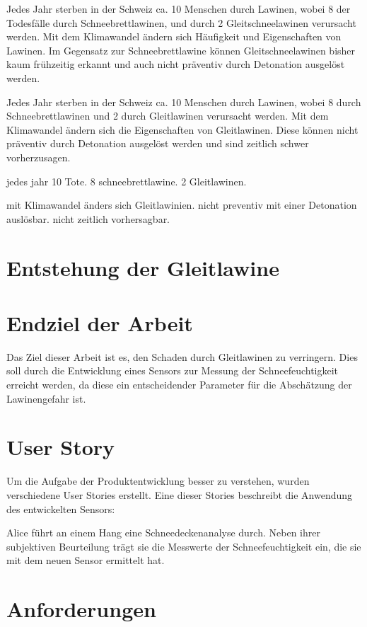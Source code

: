 Jedes Jahr sterben in der Schweiz ca. 10 Menschen durch Lawinen, wobei 8 der Todesfälle durch Schneebrettlawinen, und durch 2 Gleitschneelawinen verursacht werden. Mit dem Klimawandel ändern sich Häufigkeit und Eigenschaften von Lawinen. Im Gegensatz zur Schneebrettlawine können Gleitschneelawinen bisher kaum frühzeitig erkannt und auch nicht präventiv durch Detonation ausgelöst werden.

\iffalse
Jedes Jahr sterben in der Schweiz ca. 10 Menschen durch Lawinen, wobei 8 durch Schneebrettlawinen und 2 durch Gleitlawinen verursacht werden. Mit dem Klimawandel ändern sich die Eigenschaften von Gleitlawinen. Diese können nicht präventiv durch Detonation ausgelöst werden und sind zeitlich schwer vorherzusagen.


jedes jahr 10 Tote. 8 schneebrettlawine. 2 Gleitlawinen.

mit Klimawandel änders sich Gleitlawinien. nicht preventiv mit einer Detonation auslösbar. nicht zeitlich vorhersagbar.


\section{Entstehung der Gleitlawine}



\section{Endziel der Arbeit}

Das Ziel dieser Arbeit ist es, den Schaden durch Gleitlawinen zu verringern. Dies soll durch die Entwicklung eines Sensors zur Messung der Schneefeuchtigkeit erreicht werden, da diese ein entscheidender Parameter für die Abschätzung der Lawinengefahr ist.

\section{User Story}

Um die Aufgabe der Produktentwicklung besser zu verstehen, wurden verschiedene User Stories erstellt. Eine dieser Stories beschreibt die Anwendung des entwickelten Sensors:

Alice führt an einem Hang eine Schneedeckenanalyse durch. Neben ihrer subjektiven Beurteilung trägt sie die Messwerte der Schneefeuchtigkeit ein, die sie mit dem neuen Sensor ermittelt hat.

\section{Anforderungen}

